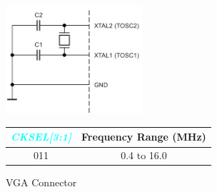 \documentclass{article}
\newcommand{\bitFormat}[1]{\emph{\textbf{\textcolor{cyan}{#1}}}}
\begin{document}
\begin{figure}[H]
	\begin{minipage}{.45\textwidth}
		\begin{center}
			\includegraphics[width=0.45\textwidth]{fullSwingCrysallOscillatorCircuit.png}
			\caption{VGA Connector}
		\end{center}
	\end{minipage}
	\begin{minipage}{.5\textwidth}
		\begin{center}
            \begin{tabular}{c|c}
                \bitFormat{CKSEL[3:1]} & \textbf{Frequency Range (MHz)}\\
                \hline
                011 & 0.4 to 16.0\\
            \end{tabular}
		\end{center}
	\end{minipage}
\end{figure}
\end{document}
